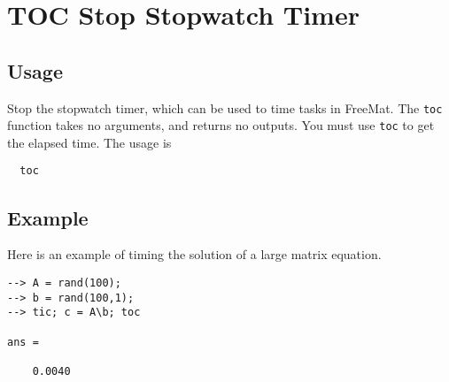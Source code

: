 \section{TOC Stop Stopwatch Timer}

\subsection{Usage}

Stop the stopwatch timer, which can be used to time tasks in FreeMat.
The \verb|toc| function takes no arguments, and returns no outputs.  You must use
\verb|toc| to get the elapsed time.  The usage is
\begin{verbatim}
  toc
\end{verbatim}
\subsection{Example}

Here is an example of timing the solution of a large matrix equation.
\begin{verbatim}
--> A = rand(100);
--> b = rand(100,1);
--> tic; c = A\b; toc

ans = 

    0.0040 
\end{verbatim}
